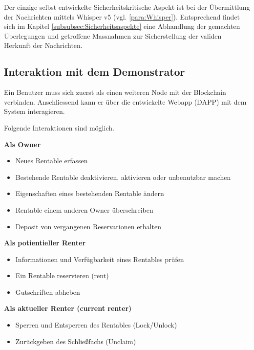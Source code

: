 Der einzige selbst entwickelte Sicherheitskritische Aspekt ist bei der Übermittlung der Nachrichten mittels Whisper v5 (vgl. \ref{para:Whisper}). Entsprechend findet sich im Kapitel \ref{subsubsec:Sicherheitsaspekte} eine Abhandlung der gemachten Überlegungen und getroffene Massnahmen zur Sicherstellung der validen Herkunft der Nachrichten.

\subsection{Interaktion mit dem Demonstrator}
\label{sec:Interaktion mit dem Demonstrator}

Ein Benutzer muss sich zuerst als einen weiteren Node mit der Blockchain verbinden. Anschliessend kann er über die entwickelte Webapp (DAPP) mit dem System interagieren. 

\vspace{1em}\noindent
Folgende Interaktionen sind möglich.

\vspace{1em}\noindent
\textbf{Als Owner}
\begin{itemize}
    \item Neues Rentable erfassen
    \item Bestehende Rentable deaktivieren, aktivieren oder unbenutzbar machen
    \item Eigenschaften eines bestehenden Rentable ändern
    \item Rentable einem anderen Owner überschreiben
    \item Deposit von vergangenen Reservationen erhalten
\end{itemize}

\vspace{1em}\noindent
\textbf{Als potientieller Renter}
\begin{itemize}
    \item Informationen und Verfügbarkeit eines Rentables prüfen
    \item Ein Rentable reservieren (rent)
    \item Gutschriften abheben
\end{itemize}

\vspace{1em}\noindent
\textbf{Als aktueller Renter (current renter)}
\begin{itemize}
    \item Sperren und Entsperren des Rentables (Lock/Unlock)
    \item Zurückgeben des Schließfachs (Unclaim)
\end{itemize}


